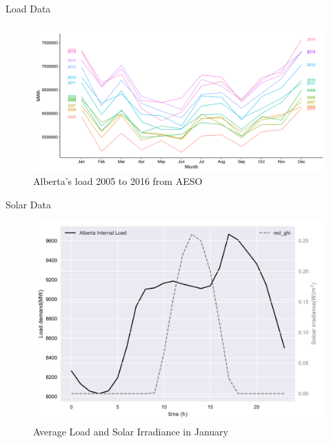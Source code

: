 \documentclass[newPxFont,numfooter,progressbar,sectionpages]{beamer}
\begin{document}

\begin{frame}[c]{Load Data}

\begin{figure}
	\centering
	\includegraphics[width=0.9\linewidth]{"figure/monthLoad"}
	\caption{Alberta’s load 2005 to 2016 from AESO}
	\label{fig:monthLoad}
\end{figure}



\end{frame}



\begin{frame}[c]{Solar Data}

\begin{figure}
	\centering
	\includegraphics[width=0.9\linewidth]{"figure/load_rad"}
	\caption{Average Load and Solar Irradiance in January}
	\label{fig:load_rad}
\end{figure}



\end{frame}
\end{document}
